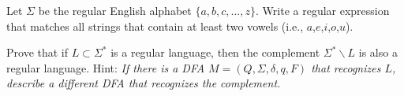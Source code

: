\documentclass[12pt]{exam}
\begin{document}
\begin{questions}


\question Let $\Sigma$ be the regular English alphabet $\{a,b,c,\ldots,z\}$.  Write a regular expression that matches all strings that contain at least two vowels (i.e., $a$,$e$,$i$,$o$,$u$).  

\vfill

\question Prove that if $L \subset \Sigma^*$ is a regular language, then the complement $\Sigma^* \backslash L$ is also a regular language. Hint: \textit{If there is a DFA $M = (Q, \Sigma, \delta, q, F)$ that recognizes $L$, describe a different DFA that recognizes the complement.}  
\vfill


\end{questions}
\end{document}
